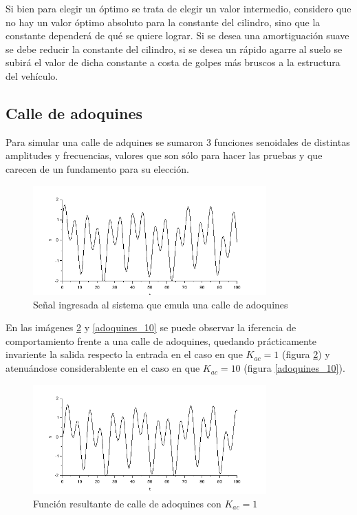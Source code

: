 \documentclass[12pt]{article}
\begin{document}
Si bien para elegir un óptimo se trata de elegir un valor intermedio, considero que no hay un valor óptimo absoluto para la constante del cilindro, sino que la constante dependerá de qué se quiere lograr. Si se desea una amortiguación suave se debe reducir la constante del cilindro, si se desea un rápido agarre al suelo se subirá el valor de dicha constante a costa de golpes más bruscos a la estructura del vehículo.


\subsection{Calle de adoquines}

Para simular una calle de adquines se sumaron 3 funciones senoidales de distintas amplitudes y frecuencias, valores que son sólo para hacer las pruebas y que carecen de un fundamento para su elección. 

\begin{figure}[h!]
\center
\includegraphics[width=0.8\textwidth]{adoquines_entrada.PNG}
\caption{Señal ingresada al sistema que emula una calle de adoquines}
\label{adoquines_entrada}
\end{figure}

En las imágenes \ref{adoquines_1} y \ref{adoquines_10} se puede observar la iferencia de comportamiento frente a una calle de adoquines, quedando prácticamente invariente la salida respecto  la entrada en el caso en que $K_{ac}=1$ (figura \ref{adoquines_1}) y atenuándose considerablente en el caso en que $K_{ac}=10$ (figura \ref{adoquines_10}).

\begin{figure}[p]
\center
\includegraphics[width=0.8\textwidth]{adoquines_1.PNG}
\caption{Función resultante de calle de adoquines con $K_{ac}=1$}
\label{adoquines_1}
\end{figure}
\end{document}
